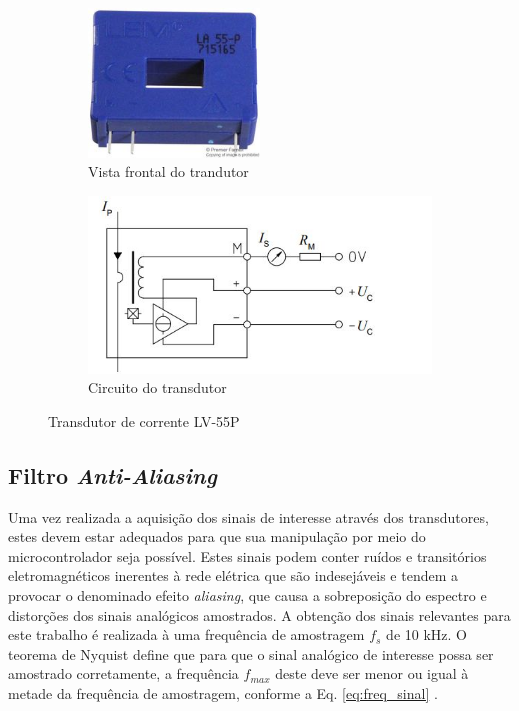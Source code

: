 \begin{figure}
	\centering
	\begin{subfigure}[b]{0.4\textwidth}
		\centering
		\includegraphics[width=0.5\textwidth]{figuras/Transdutor_Corrente.jpg}
		\caption{Vista frontal do trandutor}
	\end{subfigure}
	\begin{subfigure}[b]{0.4\textwidth}
		\includegraphics[width=\textwidth]{figuras/Transdutor_Corrente_Circuito.jpg}
		\caption{Circuito do transdutor}
	\end{subfigure}
	\caption{Transdutor de corrente LV-55P}\label{fig:transdutor_corrente}
\end{figure}

\subsection{Filtro \textit{Anti-Aliasing}}

	Uma vez realizada a aquisição dos sinais de interesse através dos transdutores, estes devem estar adequados para que sua manipulação por meio do microcontrolador seja possível.
	Estes sinais podem conter ruídos e transitórios eletromagnéticos inerentes à rede elétrica que são indesejáveis e tendem a provocar o denominado efeito \textit{aliasing}, que causa a sobreposição do espectro e distorções dos sinais analógicos amostrados.
	A obtenção dos sinais relevantes para este trabalho é realizada à uma frequência de amostragem $f_s$ de 10 kHz. O teorema de Nyquist define que para que o sinal analógico de interesse possa ser amostrado corretamente, a frequência $f_{max}$ deste deve ser menor ou igual à metade da frequência de amostragem, conforme a Eq. \ref{eq:freq_sinal} \cite{alanoppenheim2009}.

